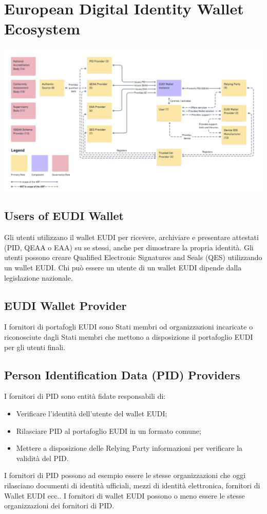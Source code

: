 \section{European Digital Identity Wallet Ecosystem}
\includegraphics[width=\textwidth]{res/images/EcosistemaEUDI.jpg}
\subsection{Users of EUDI Wallet}
Gli utenti utilizzano il wallet\glo{} EUDI per ricevere, archiviare e presentare attestati (PID, QEAA o EAA) su se stessi, anche per dimostrare la propria identità.
Gli utenti possono creare Qualified Electronic Signatures and Seals (QES) utilizzando un wallet EUDI.
Chi può essere un utente di un wallet EUDI dipende dalla legislazione nazionale.
\subsection{EUDI Wallet Provider}
I fornitori di portafogli EUDI sono Stati membri od organizzazioni incaricate o riconosciute dagli Stati membri che mettono a disposizione il portafoglio EUDI per gli utenti finali.
\subsection{Person Identification Data (PID) Providers}
I fornitori di PID sono entità fidate responsabili di:
\begin{itemize}
    \item Verificare l'identità dell'utente del wallet EUDI;
    \item Rilasciare PID al portafoglio EUDI in un formato comune;
    \item Mettere a disposizione delle Relying Party informazioni per verificare la validità del PID.
\end{itemize}
I fornitori di PID possono ad esempio essere le stesse organizzazioni che oggi rilasciano documenti di identità ufficiali, mezzi di identità elettronica, fornitori di Wallet EUDI ecc.. I fornitori di wallet EUDI possono o meno essere le stesse organizzazioni dei fornitori di PID.
